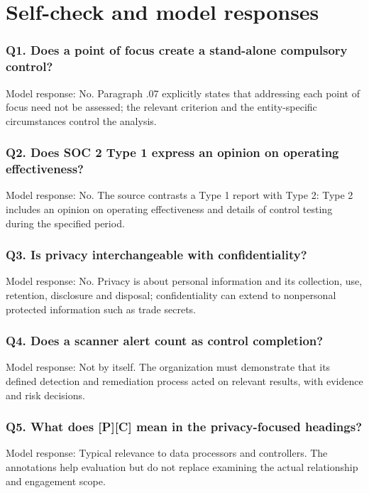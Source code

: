 \documentclass[10pt,oneside]{report}
\begin{document}
\chapter{Self-check and model responses}
\subsection{Q1. Does a point of focus create a stand-alone compulsory control?}
Model response: No. Paragraph .07 explicitly states that addressing each point of focus need not be assessed; the relevant criterion and the entity-specific circumstances control the analysis.

\subsection{Q2. Does SOC 2 Type 1 express an opinion on operating effectiveness?}
Model response: No. The source contrasts a Type 1 report with Type 2: Type 2 includes an opinion on operating effectiveness and details of control testing during the specified period.

\subsection{Q3. Is privacy interchangeable with confidentiality?}
Model response: No. Privacy is about personal information and its collection, use, retention, disclosure and disposal; confidentiality can extend to nonpersonal protected information such as trade secrets.

\subsection{Q4. Does a scanner alert count as control completion?}
Model response: Not by itself. The organization must demonstrate that its defined detection and remediation process acted on relevant results, with evidence and risk decisions.

\subsection{Q5. What does [P][C] mean in the privacy-focused headings?}
Model response: Typical relevance to data processors and controllers. The annotations help evaluation but do not replace examining the actual relationship and engagement scope.
\end{document}
